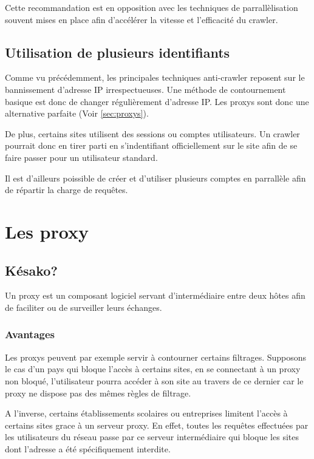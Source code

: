 \documentclass[hideweeklyreports,noposter]{polytech/polytech}
\begin{document}
            Cette recommandation est en opposition avec les techniques de parrallèlisation souvent mises en place afin d'accélérer la vitesse et l'efficacité du crawler.
            
		
		\section{Utilisation de plusieurs identifiants}
			Comme vu précédemment, les principales techniques anti-crawler reposent sur le bannissement d'adresse IP irrespectueuses.
			Une méthode de contournement basique est donc de changer régulièrement d'adresse IP.
			Les proxys sont donc une alternative parfaite (Voir \autoref{sec:proxys}).



			De plus, certains sites utilisent des sessions ou comptes utilisateurs.
			Un crawler pourrait donc en tirer parti en s'indentifiant officiellement sur le site afin de se faire passer pour un utilisateur standard.

			Il est d'ailleurs poissible de créer et d'utiliser plusieurs comptes en parrallèle afin de répartir la charge de requêtes.

	\chapter{Les proxy\label{sec:proxys}}
		\section{Késako?}
			Un proxy est un composant logiciel servant d'intermédiaire entre deux hôtes afin de faciliter ou de surveiller leurs échanges.
			
			\subsection{Avantages}
				Les proxys peuvent par exemple servir à contourner certains filtrages.
				Supposons le cas d'un pays qui bloque l'accès à certains sites, en se connectant à un proxy non bloqué, l'utilisateur pourra accéder à son site au travers de ce dernier car le proxy ne dispose pas des mêmes règles de filtrage.
				
				A l'inverse, certains établissements scolaires ou entreprises limitent l'accès à certains sites grace à un serveur proxy. En effet, toutes les requêtes effectuées par les utilisateurs du réseau passe par ce serveur intermédiaire qui bloque les sites dont l'adresse a été spécifiquement interdite.
				
\end{document}
